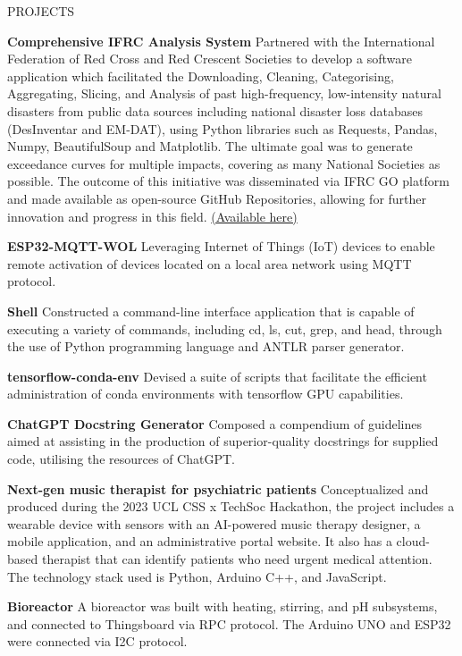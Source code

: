 \documentclass{resume} %
\begin{document}
\begin{rSection}{PROJECTS}
\vspace{-1.25em}
\item \textbf{Comprehensive IFRC Analysis System} {Partnered with the International Federation of Red Cross and Red Crescent Societies to develop a software application which facilitated the Downloading, Cleaning, Categorising, Aggregating, Slicing, and Analysis of past high-frequency, low-intensity natural disasters from public data sources including national disaster loss databases (DesInventar and EM-DAT), using Python libraries such as Requests, Pandas, Numpy, BeautifulSoup and Matplotlib. The ultimate goal was to generate exceedance curves for multiple impacts, covering as many National Societies as possible. The outcome of this initiative was disseminated via IFRC GO platform and made available as open-source GitHub Repositories, allowing for further innovation and progress in this field. \href{https://students.cs.ucl.ac.uk/2022/group5/index.html}{(Available here)}}
\item \textbf{ESP32-MQTT-WOL} {Leveraging Internet of Things (IoT) devices to enable remote activation of devices located on a local area network using MQTT protocol.}
\item \textbf{Shell} {Constructed a command-line interface application that is capable of executing a variety of commands, including cd, ls, cut, grep, and head, through the use of Python programming language and ANTLR parser generator.}
\item \textbf{tensorflow-conda-env} {Devised a suite of scripts that facilitate the efficient administration of conda environments with tensorflow GPU capabilities.}
\item \textbf{ChatGPT Docstring Generator} {Composed a compendium of guidelines aimed at assisting in the production of superior-quality docstrings for supplied code, utilising the resources of ChatGPT.}
\item \textbf{Next-gen music therapist for psychiatric patients} {Conceptualized and produced during the 2023 UCL CSS x TechSoc Hackathon, the project includes a wearable device with sensors with an AI-powered music therapy designer, a mobile application, and an administrative portal website. It also has a cloud-based therapist that can identify patients who need urgent medical attention. The technology stack used is Python, Arduino C++, and JavaScript.}
\item \textbf{Bioreactor} {A bioreactor was built with heating, stirring, and pH subsystems, and connected to Thingsboard via RPC protocol. The Arduino UNO and ESP32 were connected via I2C protocol.}
\end{rSection} 
\end{document}
